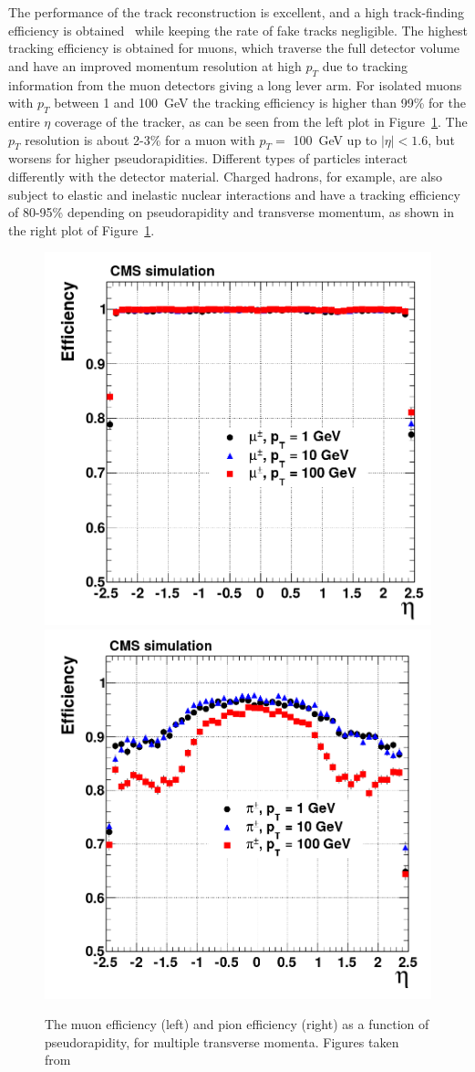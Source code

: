 The performance of the track reconstruction is excellent, and a high track-finding efficiency is obtained~\cite{Chatrchyan:2014fea} while keeping the rate of fake tracks negligible. The highest tracking efficiency is obtained for muons, which traverse the full detector volume and have an improved momentum resolution at high $p_T$ due to tracking information from the muon detectors giving a long lever arm. For isolated muons with $p_T$ between 1 and \SI{100}{GeV} the tracking efficiency is higher than 99\% for the entire $\eta$ coverage of the tracker, as can be seen from the left plot in Figure~\ref{fig:eff_eta}. The $p_T$ resolution is about 2-3\% for a muon with $p_T = $ \SI{100}{GeV} up to $|\eta| < 1.6$, but worsens for higher pseudorapidities. Different types of particles interact differently with the detector material. Charged hadrons, for example, are also subject to elastic and inelastic nuclear interactions and have a tracking efficiency of 80-95\% depending on pseudorapidity and transverse momentum, as shown in the right plot of Figure~\ref{fig:eff_eta}.

\begin{figure}[ht]
  \centering
\includegraphics[width=.4\textwidth]{muon_eff_eta}\hspace{1cm}
 \includegraphics[width=.4\textwidth]{pion_eff_eta} 
 \caption{The muon efficiency (left) and pion efficiency (right) as a function of pseudorapidity, for multiple transverse momenta. Figures taken from~\cite{Chatrchyan:2014fea}}
 \label{fig:eff_eta}
\end{figure}

